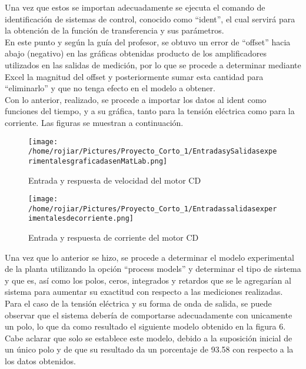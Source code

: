\documentclass[a4paper,10pt,twocolumn]{article}
\begin{document}
Una vez que estos se importan adecuadamente se ejecuta el comando de identificación de sistemas de control, conocido como ``ident'', el cual 
servirá para la obtención de la función de transferencia y sus parámetros.\\

En este punto y según la guía del profesor, se obtuvo un error de ``offset'' hacia abajo (negativo) en las gráficas obtenidas producto de los amplificadores utilizados en
las salidas de medición, por lo que se procede a determinar mediante Excel la magnitud del offset y posteriormente sumar esta cantidad para ``eliminarlo'' 
y que no tenga efecto en el modelo a obtener.\\

Con lo anterior, realizado, se procede a importar los datos al ident como funciones del tiempo, y a su gráfica, tanto para la tensión eléctrica 
como para la corriente. Las figuras se muestran a continuación.\\

\newpage

\begin{figure}[h]
\centering
\texttt{[image: /home/rojiar/Pictures/Proyecto\_Corto\_1/EntradasySalidasexperimentalesgraficadasenMatLab.png]}
\caption{Entrada y respuesta de velocidad del motor CD}
\label{Entrada y respuesta de velocidad del motor CD}
\end{figure}

\begin{figure}[h]
\centering
\texttt{[image: /home/rojiar/Pictures/Proyecto\_Corto\_1/Entradassalidasexperimentalesdecorriente.png]}
\caption{Entrada y respuesta de corriente del motor CD}
\label{Entrada y respuesta de corriente del motor CD}
\end{figure}

Una vez que lo anterior se hizo, se procede a determinar el modelo experimental de la planta utilizando la opción ``process models'' y determinar
el tipo de sistema y que es, así como los polos, ceros, integrados y retardos que se le agregarían al sistema para aumentar su exactitud con respecto
a las mediciones realizadas.\\

Para el caso de la tensión eléctrica y su forma de onda de salida, se puede observar que el sistema debería de comportarse adecuadamente con unicamente
un polo, lo que da como resultado el siguiente modelo obtenido en la figura 6. Cabe aclarar que solo se establece este modelo, debido a la suposición inicial de un único
polo y de que su resultado da un porcentaje de 93.58 con respecto a la los datos obtenidos.
\end{document}
